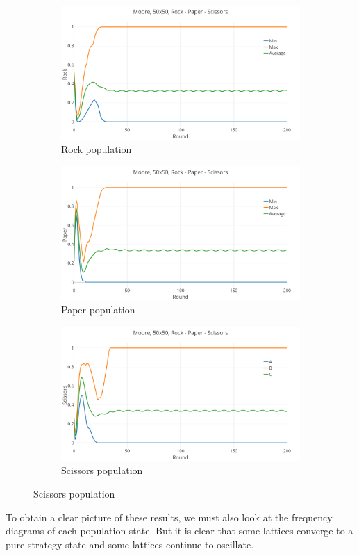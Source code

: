 \documentclass[a4paper, 11pt]{article}
\begin{document}
\begin{landscape}
\begin{figure}[H]
	\begin{subfigure}{0.53\textwidth}
		\includegraphics[width=1\linewidth]{50x50_50RockDist_Rock}
		\caption{Rock population}
	\end{subfigure}%
	\begin{subfigure}{0.53\textwidth}
		\includegraphics[width=1\linewidth]{50x50_50RockDist_Paper}
		\caption{Paper population}
	\end{subfigure}%
	\begin{subfigure}{0.53\textwidth}
		\includegraphics[width=1\linewidth]{50x50_50RockDist_Scissors}
		\caption{Scissors population}
	\end{subfigure}
\end{figure}

To obtain a clear picture of these results, we must also look at the frequency diagrams of each population state. But it is clear that some lattices converge to a pure strategy state and some lattices continue to oscillate.


\end{landscape}
\newpage
\end{document}
